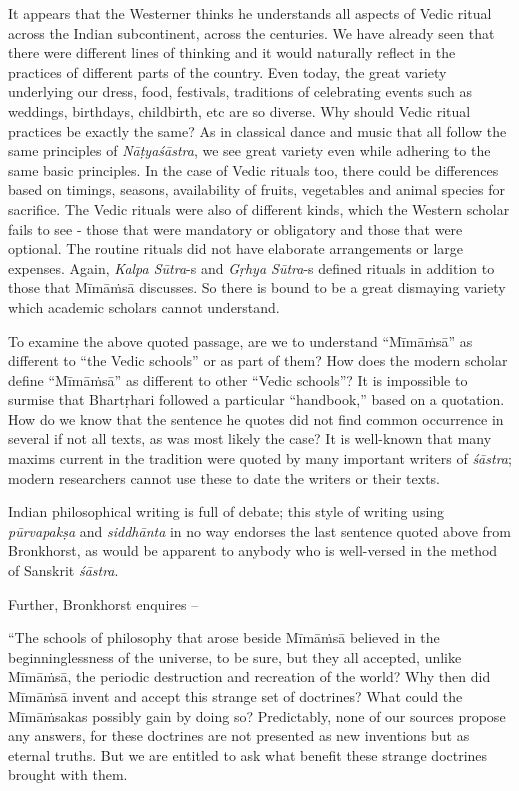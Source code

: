 It appears that the Westerner thinks he understands all aspects of Vedic ritual across the Indian subcontinent, across the centuries. We have already seen that there were different lines of thinking and it would naturally reflect in the practices of different parts of the country. Even today, the great variety underlying our dress, food, festivals, traditions of celebrating events such as weddings, birthdays, childbirth, etc are so diverse. Why should Vedic ritual practices be exactly the same? As in classical dance and music that all follow the same principles of \textit{Nāṭyaśāstra}, we see great variety even while adhering to the same basic principles. In the case of Vedic rituals too, there could be differences based on timings, seasons, availability of fruits, vegetables and animal species for sacrifice. The Vedic rituals were also of different kinds, which the Western scholar fails to see - those that were mandatory or obligatory and those that were optional. The routine rituals did not have elaborate arrangements or large expenses. Again, \textit{Kalpa Sūtra}-s and \textit{Gṛhya Sūtra}-s defined rituals in addition to those that Mīmāṁsā discusses. So there is bound to be a great dismaying variety which academic scholars cannot understand.

To examine the above quoted passage, are we to understand “Mīmāṁsā” as different to “the Vedic schools” or as part of them? How does the modern scholar define “Mīmāṁsā” as different to other “Vedic schools”? It is impossible to surmise that Bhartṛhari followed a particular “handbook,” based on a quotation. How do we know that the sentence he quotes did not find common occurrence in several if not all texts, as was most likely the case? It is well-known that many maxims current in the tradition were quoted by many important writers of \textit{śāstra}; modern researchers cannot use these to date the writers or their texts.

Indian philosophical writing is full of debate; this style of writing using \textit{pūrvapakṣa} and \textit{siddhānta} in no way endorses the last sentence quoted above from Bronkhorst, as would be apparent to anybody who is well-versed in the method of Sanskrit \textit{śāstra}.

Further, Bronkhorst enquires –

\begin{myquote}
“The schools of philosophy that arose beside Mīmāṁsā believed in the beginninglessness of the universe, to be sure, but they all accepted, unlike Mīmāṁsā, the periodic destruction and recreation of the world? Why then did Mīmāṁsā invent and accept this strange set of doctrines? What could the Mīmāṁsakas possibly gain by doing so? Predictably, none of our sources propose any answers, for these doctrines are not presented as new inventions but as eternal truths. But we are entitled to ask what benefit these strange doctrines brought with them.
\end{myquote}

